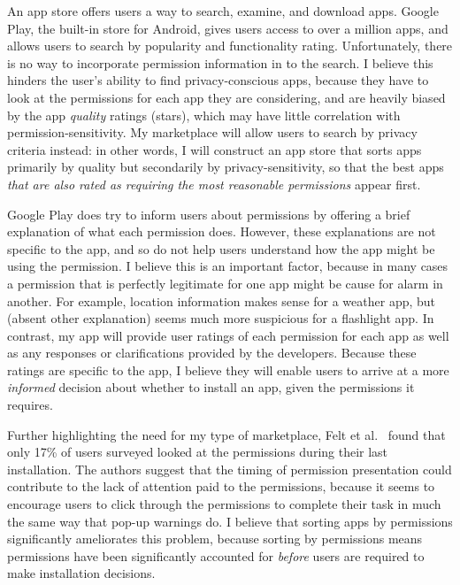 \documentclass[11pt]{article}
\begin{document}
An app store offers users a way to search, examine, and download
apps.  Google Play, the built-in store for Android, gives
users access to over a million apps, and allows users to search by
popularity and functionality rating. Unfortunately, there is no way to incorporate
permission information in to the search. I believe this hinders the
user's ability to find privacy-conscious apps, because they have to
look at the permissions for each app they are considering, and are
heavily biased by the app \emph{quality} ratings (stars), which may
have little correlation with permission-sensitivity. My marketplace
will allow users to search by privacy criteria instead: in other
words, I will construct an app store that sorts apps primarily by
quality but secondarily by privacy-sensitivity, so that the best apps
\emph{that are also rated as requiring the most reasonable
  permissions} appear first.

Google Play does try to inform users about permissions by offering a
brief explanation of what each permission does. However, these
explanations are not specific to the app, and so do not help
users understand how the app might be using the permission. I 
believe this is an important factor, because in many cases a
permission that is perfectly legitimate for one app might be cause for
alarm in another. For example, location information makes 
sense for a weather app, but (absent other explanation) seems much
more suspicious for a flashlight app. In contrast, my app will
provide user ratings of each permission for each app 
as well as any responses or clarifications provided by the
developers. Because these ratings are specific to the app, I believe
they will enable users to arrive at a more \emph{informed} decision about
whether to install an app, given the permissions it requires.

Further highlighting the need for my type of marketplace, 
Felt et al.\ \cite{android-attention-SOUPS12} 
found that only 17\% of users surveyed looked at the permissions during
their last installation. The authors suggest that the timing of
permission presentation could contribute to the lack of attention paid
to the permissions, because it seems to encourage users to click
through the permissions to complete their task in much the same way
that pop-up warnings do. I believe that sorting apps by permissions
significantly ameliorates this problem, because sorting by permissions
means permissions have been significantly accounted for \emph{before}
users are required to make installation decisions.
\end{document}
